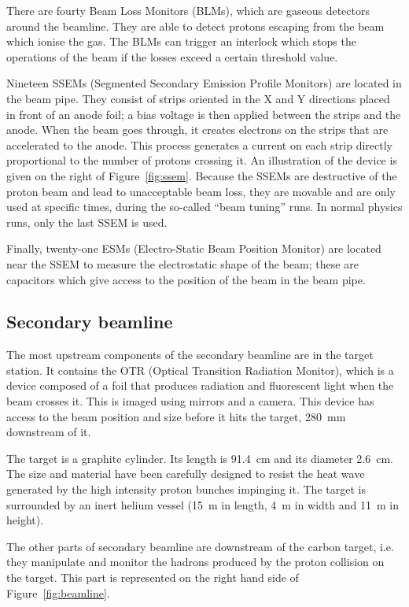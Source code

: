 There are fourty Beam Loss Monitors (\Glspl{BLM}), which are gaseous
detectors around the beamline. They are able to detect protons
escaping from the beam which ionise the gas. The \Glspl{BLM} can
trigger an interlock which stops the operations of the beam if the
losses exceed a certain threshold value.

Nineteen \Glspl{SSEM} (Segmented Secondary Emission Profile Monitors)
are located in the beam pipe. They consist of strips oriented in the X
and Y directions placed in front of an anode foil; a bias voltage is
then applied between the strips and the anode. When the beam goes
through, it creates electrons on the strips that are accelerated to
the anode. This process generates a current on each strip directly
proportional to the number of protons crossing it. An illustration of
the device is given on the right of Figure~\ref{fig:ssem}. Because the
\Glspl{SSEM} are destructive of the proton beam and lead to
unacceptable beam loss, they are movable and are only used at specific
times, during the so-called ``beam tuning'' runs. In normal physics
runs, only the last \Gls{SSEM} is used.

Finally, twenty-one \Glspl{ESM} (Electro-Static Beam Position Monitor)
are located near the \Gls{SSEM} to measure the electrostatic shape of
the beam; these are capacitors which give access to the position of
the beam in the beam pipe.

\subsection{Secondary beamline}
\label{subsec:secondarybeam}
The most upstream components of the secondary beamline are in the
target station. It contains the \Gls{OTR} (Optical Transition
Radiation Monitor), which is a device composed of a foil that produces
radiation and fluorescent light when the beam crosses it.  This is
imaged using mirrors and a camera. This device has access to the beam
position and size before it hits the target, 280~mm downstream of it.

The target is a graphite cylinder. Its length is 91.4~cm and its
diameter 2.6~cm. The size and material have been carefully designed to
resist the heat wave generated by the high intensity proton bunches
impinging it. The target is surrounded by an inert helium vessel (15~m
in length, 4~m in width and 11~m in height).

The other parts of secondary beamline are downstream of the carbon
target, i.e. they manipulate and monitor the hadrons produced by the
proton collision on the target. This part is represented on the right
hand side of Figure~\ref{fig:beamline}.

